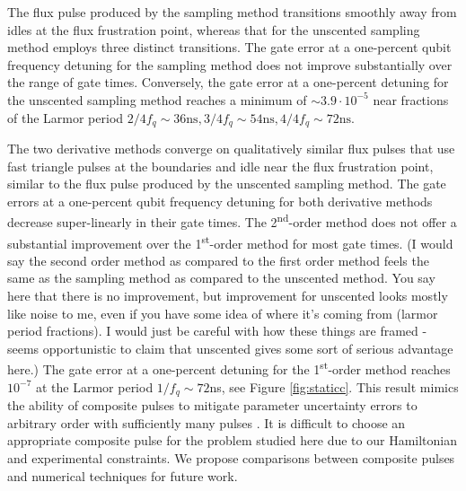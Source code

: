 The flux pulse produced by the sampling method
transitions  smoothly away from idles at the flux frustration point,
whereas that for the unscented sampling method employs
three distinct transitions.
The gate error at a one-percent qubit frequency detuning for the sampling method
does not improve substantially over the
range of gate times. Conversely, the gate error at a one-percent detuning
for the unscented sampling method reaches a minimum of $\sim 3.9 \cdot 10^{-5}$
near fractions of the Larmor period $2/4f_{q} \sim 36\textrm{ns},
3/4f_{q} \sim 54\textrm{ns}, 4/4f_{q} \sim 72\textrm{ns}$.

The two derivative methods converge on qualitatively similar flux pulses that
use fast triangle pulses at the boundaries and idle near the flux frustration point,
similar to the flux pulse produced by the unscented sampling method.
The gate errors at a one-percent qubit frequency detuning
for both derivative methods decrease super-linearly in their gate times.
The 2\textsuperscript{nd}-order method does not offer a substantial improvement
over the 1\textsuperscript{st}-order method for most gate times. (I would say the second order method as compared to the first order method feels the same as the sampling method as compared to the unscented method. You say here that there is no improvement, but improvement for unscented looks mostly like noise to me, even if you have some idea of where it's coming from (larmor period fractions). I would just be careful with how these things are framed - seems opportunistic to claim that unscented gives some sort of serious advantage here.)
The gate error at a one-percent detuning for the 1\textsuperscript{st}-order
method reaches $10^{-7}$ at the Larmor period $1 / f_{q} \sim 72$ns,
see Figure \ref{fig:staticc}.
This result mimics the
ability of composite pulses to mitigate parameter uncertainty errors to arbitrary
order with sufficiently many pulses \cite{merrill2014progress}.
It is difficult to choose an appropriate composite pulse
for the problem studied here due to our Hamiltonian and experimental constraints.
We propose comparisons between composite pulses and numerical techniques
for future work.

